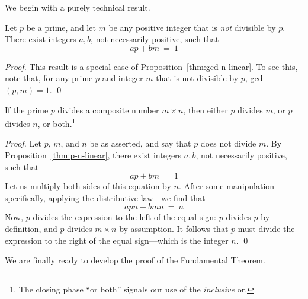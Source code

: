 \medskip

We begin with a purely technical result.

\begin{prop}
\label{thm:p-n-linear}
Let $p$ be a prime, and let $m$ be any positive integer that is {\em not} divisible by $p$.  There exist integers $a, b$, not necessarily positive, such that
\[ ap + bm \ = \ 1 \]
\end{prop}

\begin{proof}
This result is a special case of Proposition~\ref{thm:gcd-n-linear}.   To see this, note that, for any prime $p$ and integer $m$ that is not divisible by $p$,  {\sc gcd}$(p, m) = 1$.  \qed
\end{proof}

\begin{prop}
\label{thm:p-divides-onefactor}
If the prime $p$ divides a composite number $m \times n$, then either $p$ divides $m$, or $p$ divides $n$, or both.\footnote{The closing phase ``or both'' signals our use of the {\em inclusive} or.}
\end{prop}

\begin{proof}
Let $p$, $m$, and $n$ be as asserted, and say that $p$ does not divide $m$.  By Proposition~\ref{thm:p-n-linear}, there exist integers $a, b$, not necessarily positive, such that
\[ ap + bm \ = \ 1 \]
Let us multiply both sides of this equation by $n$.  After some manipulation---specifically, applying the distributive law---we find that
\[ apn + bmn \ = \ n \]
Now, $p$ divides the expression to the left of the equal sign: $p$ divides $p$ by definition, and $p$ divides $m \times n$ by assumption.  It follows that $p$ must divide the expression to the right of the equal sign---which is the integer $n$.  \qed
\end{proof}

We are finally ready to develop the proof of the Fundamental Theorem.

